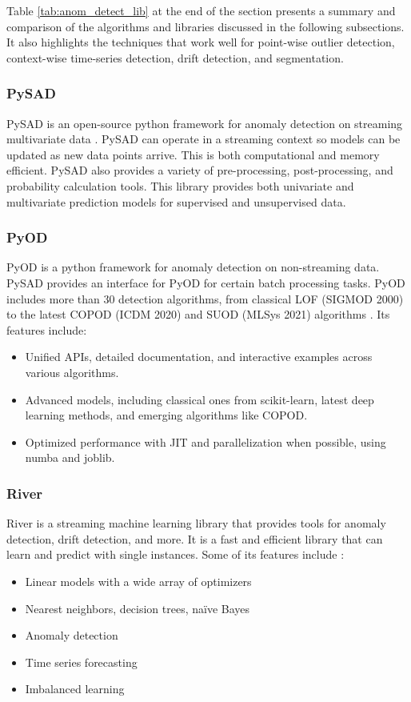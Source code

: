  Table \ref{tab:anom_detect_lib} at the end of the section presents a summary and comparison of the algorithms and libraries discussed in the following subsections. It also highlights the techniques that work well for point-wise outlier detection, context-wise time-series detection, drift detection, and segmentation. 

\subsubsection{PySAD}

PySAD is an open-source python framework for anomaly detection on streaming multivariate data \cite{pysad}. PySAD can operate in a streaming context so models can be updated as new data points arrive. This is both computational and memory efficient. PySAD also provides a variety of pre-processing, post-processing, and probability calculation tools. This library provides both univariate and multivariate prediction models for supervised and unsupervised data. 

\subsubsection{PyOD}

PyOD is a python framework for anomaly detection on non-streaming data. PySAD provides an interface for PyOD for certain batch processing tasks. PyOD includes more than 30 detection algorithms, from classical LOF (SIGMOD 2000) to the latest COPOD (ICDM 2020) and SUOD (MLSys 2021) algorithms \cite{zhao2019pyod}. Its features include:
 \begin{itemize}[leftmargin=1cm]
     \item Unified APIs, detailed documentation, and interactive examples across various algorithms.
     \item Advanced models, including classical ones from scikit-learn, latest deep learning methods, and emerging algorithms like COPOD.
     \item Optimized performance with JIT and parallelization when possible, using numba and joblib.
 \end{itemize}

\subsubsection{River}

River is a streaming machine learning library that provides tools for anomaly detection, drift detection, and more. It is a fast and efficient library that can learn and predict with single instances. Some of its features include \cite{2020river}:
 \begin{itemize}[leftmargin=1cm]
     \item Linear models with a wide array of optimizers
     \item Nearest neighbors, decision trees, naïve Bayes
     \item Anomaly detection
     \item Time series forecasting
     \item Imbalanced learning
 \end{itemize}


